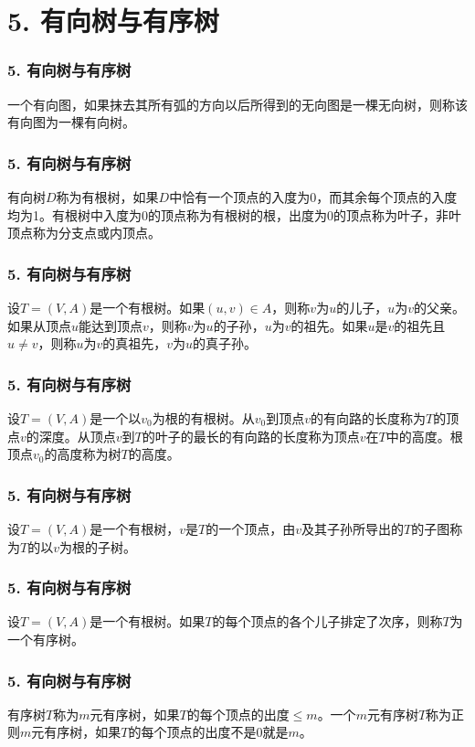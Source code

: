 \section{5. 有向树与有序树}
\begin{frame}
  \frametitle{5. 有向树与有序树}
  \begin{Def}
    一个有向图，如果抹去其所有弧的方向以后所得到的无向图是一棵无向树，则称该有向图为一棵\alert{有向树}。
  \end{Def}
\end{frame}
\begin{frame}
  \frametitle{5. 有向树与有序树}
  \begin{Def}
    有向树$D$称为\alert{有根树}，如果$D$中恰有一个顶点的入度为0，而其余每个顶点的入度均为1。有根树中入度为0的顶点称为有根树的根，出度为0的顶点称为\alert{叶子}，非叶顶点称为\alert{分支点}或\alert{内顶点}。
  \end{Def}
\end{frame}

\begin{frame}
  \frametitle{5. 有向树与有序树}
  \begin{Def}
  设$T=(V,A)$是一个有根树。如果$(u,v)\in A$，则称$v$为$u$的\alert{儿子}，$u$为$v$的\alert{父亲}。如果从顶点$u$能达到顶点$v$，则称$v$为$u$的\alert{子孙}，$u$为$v$的\alert{祖先}。如果$u$是$v$的祖先且$u \neq v$，则称$u$为$v$的\alert{真祖先}，$v$为$u$的\alert{真子孙}。
  \end{Def}
\end{frame}

\begin{frame}
  \frametitle{5. 有向树与有序树}
  \begin{Def}\justifying\let\raggedright\justifying
    设$T=(V,A)$是一个以$v_0$为根的有根树。从$v_0$到顶点$v$的有向路的长度称为$T$的顶点$v$的\alert{深度}。从顶点$v$到$T$的叶子的最长的有向路的长度称为顶点$v$在$T$中的\alert{高度}。根顶点$v_0$的高度称为树$T$的\alert{高度}。
  \end{Def}
\end{frame}

\begin{frame}
  \frametitle{5. 有向树与有序树}
  \begin{Def}
    设$T=(V,A)$是一个有根树，$v$是$T$的一个顶点，由$v$及其子孙所导出的$T$的子图称为$T$的以$v$为根的\alert{子树}。
  \end{Def}
\end{frame}

\begin{frame}
  \frametitle{5. 有向树与有序树}
  \begin{Def}
    设$T=(V,A)$是一个有根树。如果$T$的每个顶点的各个儿子排定了次序，则称$T$为一个\alert{有序树}。
  \end{Def}
\end{frame}

\begin{frame}
  \frametitle{5. 有向树与有序树}
  \begin{Def}
    有序树$T$称为\alert{$m$元有序树}，如果$T$的每个顶点的出度$\leq m$。一个$m$元有序树$T$称为\alert{正则$m$元有序树}，如果$T$的每个顶点的出度不是$0$就是$m$。
  \end{Def}
\end{frame}

